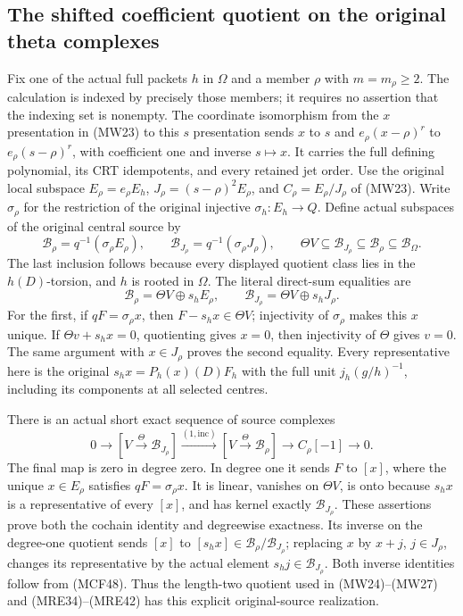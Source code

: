 \subsection{The shifted coefficient quotient on the original theta complexes}

Fix one of the actual full packets $h$ in $\Omega$ and a member
$\rho$ with $m=m_\rho\geq2$.  The calculation is indexed by precisely
those members; it requires no assertion that the indexing set is
nonempty.  The coordinate isomorphism from the $x$ presentation
in (MW23) to this $s$ presentation sends $x$ to $s$ and
$e_\rho(x-\rho)^r$ to $e_\rho(s-\rho)^r$, with coefficient one
and inverse $s\mapsto x$.  It carries the full defining
polynomial, its CRT idempotents, and every retained jet order.
Use the original local subspace $E_\rho=e_\rho E_h$,
$J_\rho=(s-\rho)^2E_\rho$, and $C_\rho=E_\rho/J_\rho$ of
(MW23).  Write $\sigma_\rho$ for the restriction of the original
injective $\sigma_h:E_h\to Q$.  Define actual subspaces of the
original central source by
\[
\mathscr B_\rho=q^{-1}(\sigma_\rho E_\rho),\qquad
\mathscr B_{J_\rho}=q^{-1}(\sigma_\rho J_\rho),\qquad
\Theta V\subseteq\mathscr B_{J_\rho}\subseteq\mathscr B_\rho
       \subseteq\mathscr B_\Omega .
\tag{MCF47}
\]
The last inclusion follows because every displayed quotient class
lies in the $h(D)$-torsion, and $h$ is rooted in $\Omega$.
The literal direct-sum equalities are
\[
\mathscr B_\rho=\Theta V\oplus s_h E_\rho,\qquad
\mathscr B_{J_\rho}=\Theta V\oplus s_h J_\rho.
\tag{MCF48}
\]
For the first, if $qF=\sigma_\rho x$, then $F-s_hx\in\Theta V$;
injectivity of $\sigma_\rho$ makes this $x$ unique.  If
$\Theta v+s_hx=0$, quotienting gives $x=0$, then injectivity of
$\Theta$ gives $v=0$.  The same argument with $x\in J_\rho$
proves the second equality.  Every representative here is the
original $s_hx=P_h(x)(D)F_h$ with the full unit
$j_h(g/h)^{-1}$, including its components at all selected centres.

There is an actual short exact sequence of source complexes
\[
0\longrightarrow[V\xrightarrow{\Theta}\mathscr B_{J_\rho}]
\xrightarrow{(1,\mathrm{inc})}
[V\xrightarrow{\Theta}\mathscr B_\rho]
\longrightarrow C_\rho[-1]\longrightarrow0.
\tag{MCF49}
\]
The final map is zero in degree zero.  In degree one it sends
$F$ to $[x]$, where the unique $x\in E_\rho$ satisfies
$qF=\sigma_\rho x$.  It is linear, vanishes on $\Theta V$,
is onto because $s_hx$ is a representative of every $[x]$,
and has kernel exactly $\mathscr B_{J_\rho}$.  These assertions
prove both the cochain identity and degreewise exactness.
Its inverse on the degree-one quotient sends $[x]$ to
$[s_hx]\in\mathscr B_\rho/\mathscr B_{J_\rho}$; replacing $x$
by $x+j$, $j\in J_\rho$, changes its representative by the
actual element $s_hj\in\mathscr B_{J_\rho}$.  Both inverse
identities follow from (MCF48).  Thus the length-two quotient
used in (MW24)--(MW27) and (MRE34)--(MRE42) has this explicit
original-source realization.

